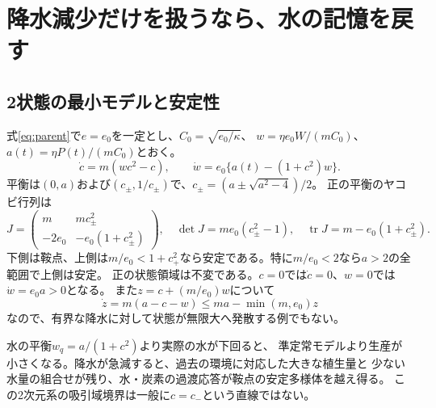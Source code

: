 \documentclass[a4paper,11pt]{ltjsarticle}
\begin{document}
\section{降水減少だけを扱うなら、水の記憶を戻す}
\subsection{2状態の最小モデルと安定性}
式\eqref{eq:parent}で$e=e_0$を一定とし、$C_0=\sqrt{e_0/\kappa}$、
$w=\eta e_0W/(mC_0)$、$a(t)=\eta P(t)/(mC_0)$とおく。
\begin{equation}\boxed{
\dot c=m(wc^2-c),\qquad
\dot w=e_0\{a(t)-(1+c^2)w\}.
}\label{eq:dynamic}
\end{equation}
平衡は$(0,a)$および$(c_\pm,1/c_\pm)$で、$c_\pm=(a\pm\sqrt{a^2-4})/2$。
正の平衡のヤコビ行列は
\begin{equation}
J=\begin{pmatrix}m&mc_\pm^2\\-2e_0&-e_0(1+c_\pm^2)\end{pmatrix},\quad
\det J=me_0(c_\pm^2-1),\quad
\operatorname{tr}J=m-e_0(1+c_\pm^2).
\end{equation}
下側は鞍点、上側は$m/e_0<1+c_+^2$なら安定である。特に$m/e_0<2$なら$a>2$の全範囲で上側は安定。
正の状態領域は不変である。$c=0$では$\dot c=0$、$w=0$では$\dot w=e_0a>0$となる。
また$z=c+(m/e_0)w$について
\begin{equation}
\dot z=m(a-c-w)\leq ma-\min(m,e_0)z
\end{equation}
なので、有界な降水に対して状態が無限大へ発散する例でもない。

水の平衡$w_q=a/(1+c^2)$より実際の水が下回ると、
準定常モデルより生産が小さくなる。降水が急減すると、過去の環境に対応した大きな植生量と
少ない水量の組合せが残り、水・炭素の過渡応答が鞍点の安定多様体を越え得る。
この2次元系の吸引域境界は一般に$c=c_-$という直線ではない。
\end{document}
